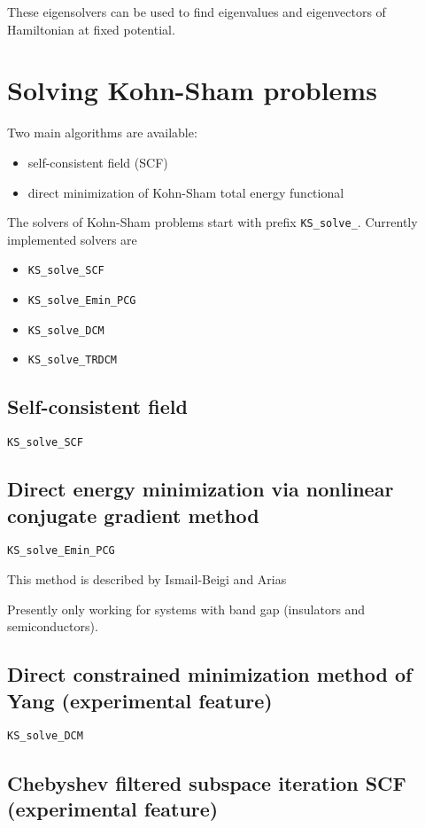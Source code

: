 \documentclass[a4paper,10pt,twocolumn]{paper}
\newcommand{\jlcode}[1]{\texttt{#1}}
\begin{document}
These eigensolvers can be used to find eigenvalues and eigenvectors
of Hamiltonian at fixed potential.



\section{Solving Kohn-Sham problems}

Two main algorithms are available:
\begin{itemize}
\item self-consistent field (SCF)
\item direct minimization of Kohn-Sham total energy functional
\end{itemize}

The solvers of Kohn-Sham problems start with prefix \jlcode{KS_solve_}.
Currently implemented solvers are
\begin{itemize}
\item \jlcode{KS_solve_SCF}
\item \jlcode{KS_solve_Emin_PCG}
\item \jlcode{KS_solve_DCM}
\item \jlcode{KS_solve_TRDCM}
\end{itemize}


\subsection{Self-consistent field}
\jlcode{KS_solve_SCF}


\subsection{Direct energy minimization via nonlinear conjugate gradient method}

\jlcode{KS_solve_Emin_PCG}

This method is described by Ismail-Beigi and Arias

Presently only working for systems with band gap (insulators and semiconductors).

\subsection{Direct constrained minimization method of Yang (experimental feature)}

\jlcode{KS_solve_DCM}

\subsection{Chebyshev filtered subspace iteration SCF (experimental feature)}
\end{document}
